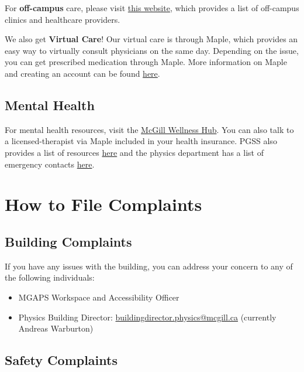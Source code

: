     For \textbf{off-campus} care, please visit \href{https://www.mcgill.ca/wellness-hub/get-support/find-community-resources/navigatinghealthcare}{this website}, which provides a list of off-campus clinics and healthcare providers. 

    We also get \textbf{Virtual Care}! Our virtual care is through Maple, which provides an easy way to virtually consult physicians on the same day. Depending on the issue, you can get prescribed medication through Maple. More information on Maple and creating an account can be found \href{https://www.mcgill.ca/internationalstudents/health/benefits/maple-virtual-care}{here}.
    

    \subsection{Mental Health}
    For mental health resources, visit the 
    \href{https://www.mcgill.ca/wellness-hub/get-support/mental-health-support}{McGill Wellness Hub}. You can also talk to a licensed-therapist via Maple included in your health insurance. PGSS also provides a list of resources \href{https://pgss.mcgill.ca/en/mental-health-resources}{here} and the physics department has a list of emergency contacts \href{https://www.physics.mcgill.ca/resources/grads.html}{here}. 
    

    \section{How to File Complaints} 
    

\subsection{Building Complaints}

If you have any issues with the building, you can address your concern to any of the following individuals:
\begin{itemize}
  \item MGAPS Workspace and Accessibility Officer
  \item Physics Building Director: \href{mailto:buildingdirector.physics@mcgill.ca}{buildingdirector.physics@mcgill.ca} (currently Andreas Warburton)
\end{itemize}

\subsection{Safety Complaints}


